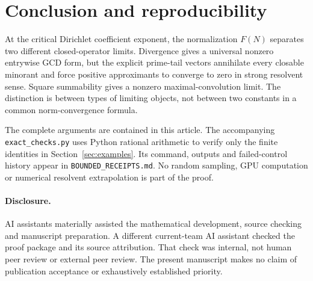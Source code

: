 \section{Conclusion and reproducibility}
\label{sec:conclusion}

At the critical Dirichlet coefficient exponent, the normalization
$F(N)$ separates two different closed-operator limits.
Divergence gives a universal nonzero entrywise GCD form, but the
explicit prime-tail vectors annihilate every closable minorant and
force positive approximants to converge to zero in strong resolvent
sense. Square summability gives a nonzero maximal-convolution limit.
The distinction is between types of limiting objects, not between
two constants in a common norm-convergence formula.

The complete arguments are contained in this article.
The accompanying \texttt{exact\_checks.py} uses Python rational
arithmetic to verify only the finite identities in
Section~\ref{sec:examples}. Its command, outputs and failed-control
history appear in \texttt{BOUNDED\_RECEIPTS.md}.
No random sampling, GPU computation or numerical resolvent extrapolation
is part of the proof.

\paragraph{Disclosure.}
AI assistants materially assisted the mathematical development,
source checking and manuscript preparation. A different current-team
AI assistant checked the proof package and its source attribution.
That check was internal, not human peer review or external peer review.
The present manuscript makes no claim of publication acceptance or
exhaustively established priority.
